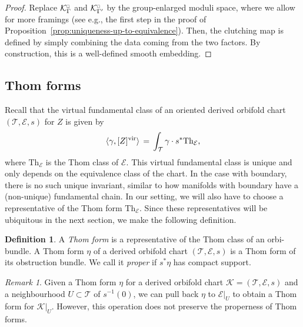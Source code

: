 \documentclass[11pt,psamsfonts, oneside, reqno]{amsart}
\newcommand{\sub}{\subset}%
\newcommand{\inv}{^{-1}}
\newcommand{\lspan}[1]{\langle {#1}\rangle}
\newcommand{\vfc}[1]{[#1]^{\virt}}
\newcommand{\cE}{\mathcal{E}}
\newcommand{\cK}{\mathcal{K}}
\newcommand{\cT}{\mathcal{T}}
\newcommand{\virt}{\normalfont\text{vir}}
\newcommand{\obs}{s}
\newcommand{\cKc}{\cK^{\scale{\square}{0.6}}}
\newcommand{\scale}[2]{\scaleobj{#2}{#1}}
\theoremstyle{definition}
\newtheorem{definition}[theorem]{Definition}
\theoremstyle{remark}
\newtheorem{remark}[theorem]{Remark}
\numberwithin{equation}{section}
\begin{document}
\begin{proof} Replace ${\cKc_\Gamma}$ and ${\cKc_{\Gamma'}}$ by the group-enlarged moduli space, where we allow for more framings (see e.g., the first step in the proof of Proposition~\ref{prop:uniqueness-up-to-equivalence}). Then, the clutching map is defined by simply combining the data coming from the two factors. By construction, this is a well-defined smooth embedding.
\end{proof}





\subsection{Thom forms} Recall that the virtual fundamental class of an oriented derived orbifold chart $(\cT,\cE,\obs)$ for $Z$ is given by 
\begin{equation}\label{}\lspan{\gamma,\vfc{Z}} \,=\, \int_{\cT}\gamma\cdot \obs^*\text{Th}_\cE,\end{equation}
where $\text{Th}_\cE$ is the Thom class of $\cE$. This virtual fundamental class is unique and only depends on the equivalence class of the chart. In the case with boundary, there is no such unique invariant, similar to how manifolds with boundary have a (non-unique) fundamental chain. In our setting, we will also have to choose a representative of the Thom form $\text{Th}_\cE$. Since these representatives will be ubiquitous in the next section, we make the following definition.

\begin{definition}\label{} A \emph{Thom form} is a representative of the Thom class of an orbi-bundle. A Thom form $\eta$ of a derived orbifold chart $(\cT,\cE,\obs)$ is a Thom form of its obstruction bundle. We call it \emph{proper} if $\obs^*\eta$ has compact support.\end{definition}


\begin{remark}\label{rem:properness-thom-form} Given a Thom form $\eta$ for a derived orbifold chart $\cK= (\cT,\cE,\obs)$ and a neighbourhood $U \sub \cT$ of $\obs\inv(0)$, we can pull back $\eta$ to $\cE|_U$ to obtain a Thom form for $\cK|_U$. However, this operation does not preserve the properness of Thom forms.\end{remark}
\end{document}

